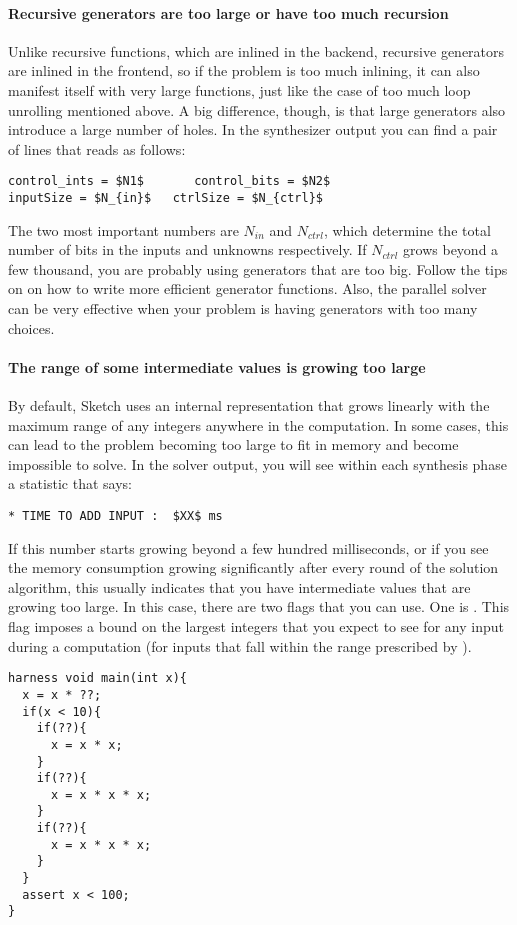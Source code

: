 \paragraph{Recursive generators are too large or have too much recursion}
Unlike recursive functions, which are inlined in the backend, recursive
generators are inlined in the frontend, so if the problem is too much inlining,
it can also manifest itself with very large functions, just like the case of
too much loop unrolling mentioned above. A big difference, though, is that
large generators also introduce a large number of holes.
In the synthesizer output you can find a pair of lines that reads as follows:
\begin{lstlisting}
control_ints = $N1$       control_bits = $N2$
inputSize = $N_{in}$   ctrlSize = $N_{ctrl}$
\end{lstlisting}
The two most important numbers are $N_{in}$ and $N_{ctrl}$, which determine
the total number of bits in the inputs and unknowns respectively. If $N_{ctrl}$
grows beyond a few thousand, you are probably using generators that are
too big. Follow the tips on  on how to write more efficient
generator functions. Also, the parallel solver can be very effective when your problem
is having generators with too many choices.

\paragraph{The range of some intermediate values is growing too large}
By default, Sketch uses an internal representation that grows linearly
with the maximum range of any integers anywhere in the computation.
In some cases, this can lead to the problem becoming too large to fit in
memory and become impossible to solve. In the solver output, you will
see within each synthesis phase a statistic that says:
\begin{lstlisting}
* TIME TO ADD INPUT :  $XX$ ms
\end{lstlisting}
If this number starts growing beyond a few hundred milliseconds, or if you see
the memory consumption growing significantly after every round of the solution
algorithm, this usually indicates that you have intermediate values that
are growing too large. In this case, there are two flags that you can use.
One is . This flag imposes a bound on the largest integers
that you expect to see for any input during a computation (for inputs that
fall within the range prescribed by ).
\begin{lstlisting}
harness void main(int x){
  x = x * ??;
  if(x < 10){
    if(??){
      x = x * x;
    }
    if(??){
      x = x * x * x;
    }
    if(??){
      x = x * x * x;
    }
  }
  assert x < 100;
}
\end{lstlisting}


